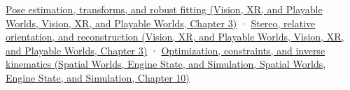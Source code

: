 \href{../07-Vision-XR-and-Playable-Worlds/main.pdf\#nameddest=04-visual-computing-ii-ch032-pose-estimation-transforms-and-robust-fitting}{Pose estimation, transforms, and robust fitting (Vision, XR, and Playable Worlds, Vision, XR, and Playable Worlds, Chapter 3)} · \href{../07-Vision-XR-and-Playable-Worlds/main.pdf\#nameddest=04-visual-computing-ii-ch032-stereo-relative-orientation-and-reconstruction}{Stereo, relative orientation, and reconstruction (Vision, XR, and Playable Worlds, Vision, XR, and Playable Worlds, Chapter 3)} · \href{../05-Spatial-Worlds-Engine-State-and-Simulation/main.pdf\#nameddest=04-visual-computing-ii-ch029-optimization-constraints-and-inverse-kinematics}{Optimization, constraints, and inverse kinematics (Spatial Worlds, Engine State, and Simulation, Spatial Worlds, Engine State, and Simulation, Chapter 10)}

